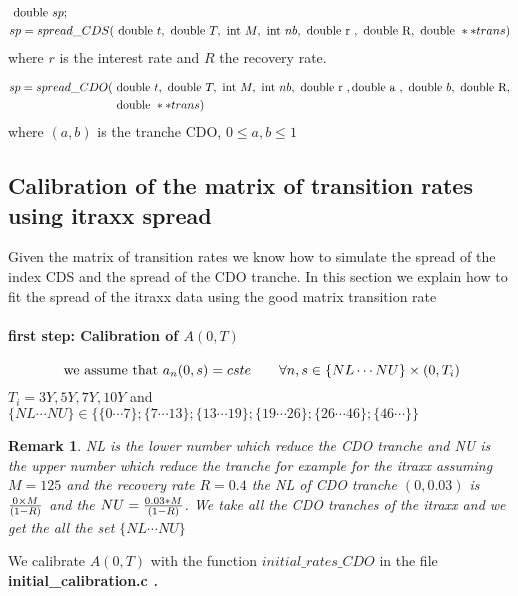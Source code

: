 \documentclass[reqno,11pt,twoside,english]{report}
\newtheorem{Remark}{Remark}
\newcommand{\1}{{1} \hspace{-0.25 em}{\rm I}}
\begin{document}
\begin{equation*}
\begin{split}
&\hbox{ double } sp;\\
&sp=spread\_CDS(\hbox{ double } t,\hbox{ double } T, \hbox{ int } M,\hbox{ int }nb,\hbox{ double r },\hbox{ double R}, \hbox{ double }**trans) 
\end{split}
\end{equation*}
where $r$ is the interest rate and $R$ the recovery rate.

\begin{equation*}
\begin{split}
sp=spread\_CDO(&\hbox{ double } t,\hbox{ double } T, \hbox{ int } M,\hbox{ int }nb,\hbox{ double r },\hbox{double a },\hbox{ double } b,\hbox{ double R}, \\&\hbox{ double }**trans) 
\end{split}
\end{equation*}
where $(a,b)$ is the tranche CDO, $0\le a,b\le 1$


\subsection{Calibration of the matrix of transition rates using itraxx spread}
Given the matrix of transition rates we know how to simulate the spread of the index CDS and the spread of the CDO tranche. In this section we explain how to fit the spread of the itraxx data using  the good matrix transition rate
\paragraph{first step: Calibration of $A(0,T)$}   $$ \hbox{ we assume that } a_n(0,s)=cste  \qquad \forall n,s \in \{NL\cdots NU\}\times (0,T_i)$$
$T_i=3Y,5Y,7Y,10Y$ and $\{NL\cdots NU\}\in \{\{0\cdots 7\};\{7\cdots 13\};\{13\cdots 19\};\{19\cdots 26\};\{26\cdots 46\};\{46\cdots\}\}$ 
\begin{Remark}
NL is the lower number which reduce the CDO tranche  and NU is the upper number which reduce the tranche  for example for the itraxx assuming $M=125$ and the recovery rate $R=0.4$ the NL of  CDO tranche $(0,0.03)$ is ${0\times M\over (1-R)}$ and the $NU={0.03*M\over(1-R)}$. We take all the CDO tranches of the itraxx and we get the all the set $\{NL\cdots NU\}$  
\end{Remark}

We calibrate $A(0,T)$ with the function $initial\_rates\_CDO$ in the file \bf initial\_calibration.c \sl.
\end{document}
